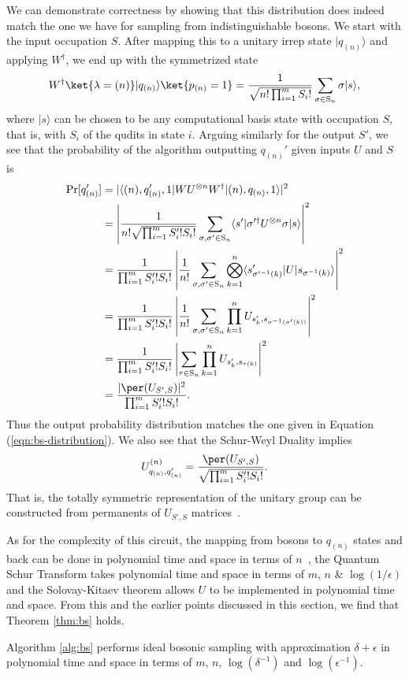 We can demonstrate correctness by showing that this distribution does indeed match the one we have for sampling from indistinguishable bosons. 
We start with the input occupation $S$. 
After mapping this to a unitary irrep state $|q_{(n)}\rangle$ and applying $W^\dagger$, we end up with the symmetrized state
\begin{equation}\label{eq:IdealState}
W^\dagger\ket{\lambda=(n)}|q_{(n)}\rangle\ket{p_{(n)}=1}
 = \frac{1}{\sqrt{n! \prod_{i=1}^m S_i!}}\sum_{\sigma \in  \textrm{S}_n}\sigma|s\rangle ,
\end{equation}
where $|s\rangle$ can be chosen to be any computational basis state with occupation $S$, that is, with $S_i$ of the qudits in state $i$.
Arguing similarly for the output $S'$, we see that the probability of the algorithm outputting $q_{(n)}'$ given inputs $U$ and $S$ is
\begin{align}
\textrm{Pr}[q_{(n)}']
&= \vert \langle (n), q_{(n)}', 1\vert W U^{\otimes n} W^\dag |(n), q_{(n)}, 1\rangle \vert^2 \\
&= \left|\frac{1}{n!\sqrt{\prod_{i=1}^m S'_i! S_i!}}\sum_{\sigma, \sigma'\in \textrm{S}_n}\langle s'|{\sigma}'^\dag{U}^{\otimes n}{\sigma}|s\rangle\right|^2\\
&= \frac{1}{\prod_{i=1}^m S'_i! S_i!}\left|\frac{1}{n!}\sum_{\sigma, \sigma'\in \textrm{S}_n}\bigotimes_{k=1}^n \langle s'_{\sigma'^{-1}(k)}|{U}|s_{\sigma^{-1}(k)}\rangle\right|^2\\
&= \frac{1}{\prod_{i=1}^m S'_i! S_i!}\left|\frac{1}{n!}\sum_{\sigma, \sigma'\in \textrm{S}_n}\prod_{k=1}^n U_{s'_{k},s_{\sigma^{-1}(\sigma'(k))}}\right|^2\\
&= \frac{1}{\prod_{i=1}^m S'_i! S_i!}\left|\sum_{\tau \in \textrm{S}_n}\prod_{k=1}^n U_{s'_{k},s_{\tau(k)}}\right|^2\\
&= \frac{|\per(U_{S',S})|^2}{\prod_{i=1}^m S'_i! S_i!}.
\end{align}
Thus the output probability distribution matches the one given in Equation (\ref{eqn:bs-distribution}).
We also see that the Schur-Weyl Duality implies
\begin{equation}
U^{(n)}_{q_{(n)}, q_{(n)}'} = \frac{\per(U_{S',S})}{\sqrt{\prod_{i=1}^m S'_i! S_i!}}.
\label{eqn:symmetric_action}
\end{equation}
That is, the totally symmetric representation of the unitary group can be constructed from permanents of $U_{S',S}$ matrices~\cite{bhatia1997}.

As for the complexity of this circuit, the mapping from bosons to $q_{(n)}$ states and back can be done in polynomial time and space in terms of $n$~\cite{rowe1999}, the Quantum Schur Transform takes polynomial time and space in terms of $m$, $n$ \& $\log(1/\epsilon)$ and the Solovay-Kitaev theorem allows $U$ to be implemented in polynomial time and space. 
From this and the earlier points discussed in this section, we find that Theorem \ref{thm:bs} holds.
\begin{theorem}
Algorithm \ref{alg:bs} performs ideal bosonic sampling with approximation $\delta+\epsilon$ in polynomial time and space in terms of $m$, $n$, $\log(\delta^{-1})$ and $\log(\epsilon^{-1})$.
\label{thm:bs}
\end{theorem}

